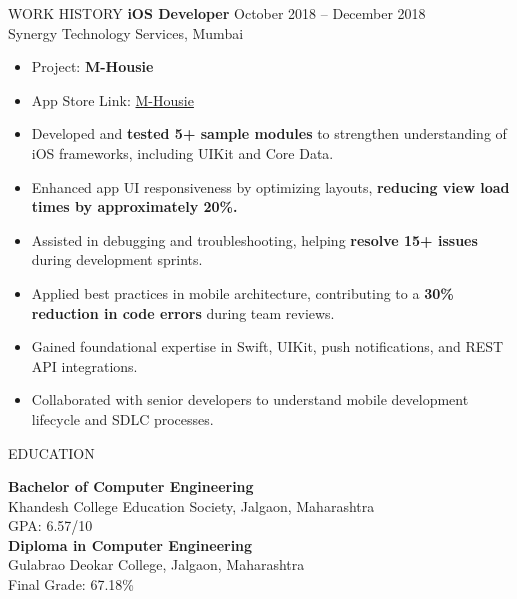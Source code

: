 \documentclass{resume} %
\begin{document}
\begin{rSection}{WORK HISTORY}
\textbf{iOS Developer} \hfill October 2018 -- December 2018\\
Synergy Technology Services, Mumbai
\begin{itemize}
    \itemsep -3pt
    \item Project: \textbf{M-Housie}
    \item App Store Link: \href{https://apps.apple.com/in/app/m-housie/id1224533844}{M-Housie}
    \item Developed and \textbf{tested 5+ sample modules} to strengthen understanding of iOS frameworks, including UIKit and Core Data.
    \item Enhanced app UI responsiveness by optimizing layouts, \textbf{reducing view load times by approximately 20\%.}
    \item Assisted in debugging and troubleshooting, helping \textbf{resolve 15+ issues} during development sprints.
    \item Applied best practices in mobile architecture, contributing to a \textbf{30\% reduction in code errors} during team reviews.
    \item Gained foundational expertise in Swift, UIKit, push notifications, and REST API integrations.
    \item Collaborated with senior developers to understand mobile development lifecycle and SDLC processes.
\end{itemize}

\end{rSection}
\newpage


\begin{rSection}{EDUCATION}

\textbf{Bachelor of Computer Engineering} \\
Khandesh College Education Society, Jalgaon, Maharashtra \\
GPA: 6.57/10 \\[0.4em]

\textbf{Diploma in Computer Engineering} \\
Gulabrao Deokar College, Jalgaon, Maharashtra \\
Final Grade: 67.18\% 

\end{rSection}
\end{document}
